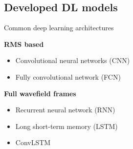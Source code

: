 \documentclass[10pt,aspectratio=169]{beamer} %
\begin{document}
\setcounter{subfigure}{0}
\subsection{Developed DL models}
\begin{frame}{Common deep learning architectures}
	
	\begin{minipage}[t]{0.45\textwidth}
		\textbf{RMS based}\\
		\begin{itemize}
			\item Convolutional neural networks (CNN)
			\item Fully convolutional network (FCN)
		\end{itemize}		
	\end{minipage}
	\hfill
	\begin{minipage}[t]{0.45\textwidth}
		\textbf{Full wavefield frames}\\
		\begin{itemize}
			\item Recurrent neural network (RNN)
			\item Long short-term memory (LSTM)
			\item ConvLSTM
		\end{itemize}	
	\end{minipage}
\end{frame}
\end{document}
